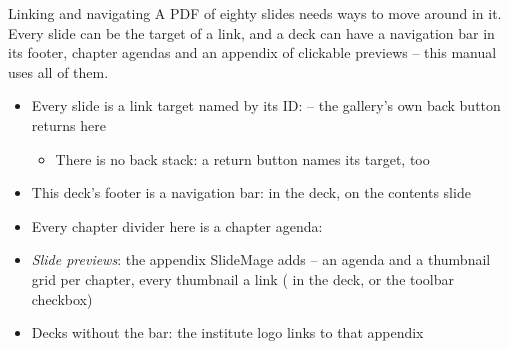 
\begin{standardframe}{Linking and navigating}
	\small
	A PDF of eighty slides needs ways to move around in it. Every slide can be
	the target of a link, and a deck can have a navigation bar in its footer,
	chapter agendas and an appendix of clickable previews -- this manual uses
	all of them.
	\par\medskip
	\begin{itemize}
		\item Every slide is a link target named by its ID:  \hyperlink{1td}{} -- the gallery's own back button returns here
		\begin{itemize}
			\item There is no back stack: a return button names its target, too
		\end{itemize}
		\item This deck's footer is a navigation bar: \SMCode{[...]} in the deck,  on the contents slide
		\item Every chapter divider here is a chapter agenda: 
		\item \emph{Slide previews}: the appendix SlideMage adds -- an agenda and a thumbnail grid per chapter, every thumbnail a link ( in the deck, or the toolbar checkbox)
		\item Decks without the bar: the institute logo links to that appendix
	\end{itemize}
\end{standardframe}
